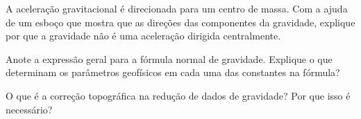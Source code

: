 \documentclass[]{book}
\theoremstyle{definition}
\theoremstyle{definition}
\theoremstyle{definition}
\theoremstyle{remark}
\let\BeginKnitrBlock\begin \let\EndKnitrBlock\end
\begin{document}
\BeginKnitrBlock{exercise}
\protect\hypertarget{exr:exr6}{}{\label{exr:exr6} }A aceleração gravitacional é direcionada para um centro de massa. Com a ajuda de um esboço que mostra que as direções das componentes da gravidade, explique por que a gravidade não é uma aceleração dirigida centralmente.
\EndKnitrBlock{exercise}

\BeginKnitrBlock{exercise}
\protect\hypertarget{exr:exr7}{}{\label{exr:exr7} }Anote a expressão geral para a fórmula normal de gravidade. Explique o que determinam os parâmetros geofísicos em cada uma das constantes na fórmula?
\EndKnitrBlock{exercise}

\BeginKnitrBlock{exercise}
\protect\hypertarget{exr:exr8}{}{\label{exr:exr8} }O que é a correção topográfica na redução de dados de gravidade? Por que isso é necessário?
\EndKnitrBlock{exercise}


\end{document}
